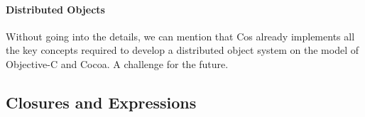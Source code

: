 \documentclass[preprint,10pt]{sigplanconf}
\newcommand{\acronym}[1]{{\sc #1}\xspace}
\newcommand{\Cocoa}  {\acronym{Cocoa}}
\newcommand{\ProgLang}[1]{{\sc #1}\xspace}
\newcommand{\Cos}       {\ProgLang{Cos}}
\begin{document}
\paragraph{Distributed Objects} Without going into the details, we can mention that \Cos already implements all the key concepts required to develop a distributed object system on the model of {\sc Objec\-tive-C} and \Cocoa. A challenge for the future.











\subsection{Closures and Expressions\label{ssec:clo}}
\end{document}
